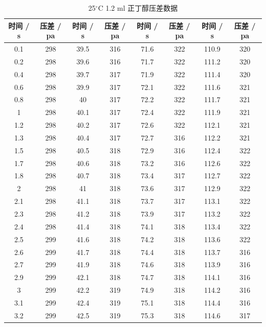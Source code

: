 \documentclass[12pt]{ctexart}
\numberwithin{equation}{section}
\begin{document}
\begin{longtable}{cc|cc|cc|cc}
    \caption{25$^\circ$C  1.2 ml 正丁醇压差数据} \\
    \hline
    时间 / s & 压差 / pa & 时间 / s & 压差 / pa & 时间 / s & 压差 / pa & 时间 / s & 压差 / pa \\
    \hline
    0.1  &  298  &  39.5  &  316  &  71.6  &  322  &  110.9  &  320  \\
0.2  &  298  &  39.6  &  316  &  71.7  &  322  &  111.2  &  320  \\
0.4  &  298  &  39.7  &  317  &  71.9  &  322  &  111.4  &  320  \\
0.6  &  298  &  39.9  &  317  &  72.1  &  322  &  111.6  &  321  \\
0.8  &  298  &  40  &  317  &  72.2  &  322  &  111.7  &  321  \\
1  &  298  &  40.1  &  317  &  72.4  &  322  &  111.9  &  321  \\
1.2  &  298  &  40.2  &  317  &  72.6  &  322  &  112.1  &  321  \\
1.3  &  298  &  40.4  &  317  &  72.7  &  316  &  112.2  &  321  \\
1.5  &  298  &  40.5  &  318  &  72.9  &  316  &  112.4  &  322  \\
1.7  &  298  &  40.6  &  318  &  73.2  &  316  &  112.6  &  322  \\
1.8  &  298  &  40.7  &  318  &  73.4  &  317  &  112.7  &  322  \\
2  &  298  &  41  &  318  &  73.6  &  317  &  112.9  &  322  \\
2.1  &  298  &  41.1  &  318  &  73.7  &  317  &  113.1  &  322  \\
2.3  &  298  &  41.2  &  318  &  73.9  &  317  &  113.2  &  322  \\
2.4  &  298  &  41.4  &  318  &  74.1  &  318  &  113.4  &  322  \\
2.5  &  299  &  41.6  &  318  &  74.2  &  318  &  113.6  &  322  \\
2.6  &  299  &  41.7  &  318  &  74.4  &  318  &  113.7  &  316  \\
2.7  &  299  &  41.9  &  318  &  74.6  &  318  &  113.9  &  316  \\
2.9  &  299  &  42.1  &  318  &  74.7  &  318  &  114.1  &  316  \\
3  &  299  &  42.2  &  319  &  74.9  &  318  &  114.2  &  316  \\
3.1  &  299  &  42.4  &  319  &  75.1  &  318  &  114.4  &  316  \\
3.2  &  299  &  42.5  &  319  &  75.3  &  318  &  114.6  &  317  \\

\end{longtable}
\end{document}
